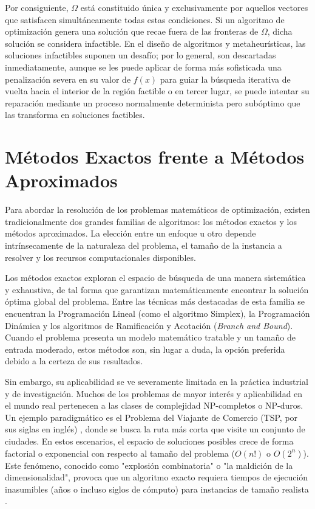 \documentclass[12pt,a4paper,twoside,openright]{book}
\begin{document}
    Por consiguiente, $\Omega$ está constituido única y exclusivamente por aquellos vectores que satisfacen simultáneamente todas estas condiciones. Si un algoritmo de optimización genera una solución que recae fuera de las fronteras de $\Omega$, dicha solución se considera infactible. En el diseño de algoritmos y metaheurísticas, las soluciones infactibles suponen un desafío; por lo general, son descartadas inmediatamente, aunque se les puede aplicar de forma más sofisticada una penalización severa en su valor de $f(x)$ para guiar la búsqueda iterativa de vuelta hacia el interior de la región factible o en tercer lugar, se puede intentar su reparación mediante un proceso normalmente determinista pero subóptimo que las transforma en soluciones factibles.

 \section{Métodos Exactos frente a Métodos Aproximados}

    Para abordar la resolución de los problemas matemáticos de optimización, existen tradicionalmente dos grandes familias de algoritmos: los métodos exactos y los métodos aproximados. La elección entre un enfoque u otro depende intrínsecamente de la naturaleza del problema, el tamaño de la instancia a resolver y los recursos computacionales disponibles.

    Los métodos exactos exploran el espacio de búsqueda de una manera sistemática y exhaustiva, de tal forma que garantizan matemáticamente encontrar la solución óptima global del problema. Entre las técnicas más destacadas de esta familia se encuentran la Programación Lineal (como el algoritmo Simplex), la Programación Dinámica y los algoritmos de Ramificación y Acotación (\textit{Branch and Bound}). Cuando el problema presenta un modelo matemático tratable y un tamaño de entrada moderado, estos métodos son, sin lugar a duda, la opción preferida debido a la certeza de sus resultados.

    Sin embargo, su aplicabilidad se ve severamente limitada en la práctica industrial y de investigación. Muchos de los problemas de mayor interés y aplicabilidad en el mundo real pertenecen a las clases de complejidad NP-completos o NP-duros. Un ejemplo paradigmático es el Problema del Viajante de Comercio (TSP, por sus siglas en inglés) \cite{talbi2009metaheuristics}, donde se busca la ruta más corta que visite un conjunto de ciudades. En estos escenarios, el espacio de soluciones posibles crece de forma factorial o exponencial con respecto al tamaño del problema ($O(n!)$ o $O(2^n)$). Este fenómeno, conocido como "explosión combinatoria" o "la maldición de la dimensionalidad", provoca que un algoritmo exacto requiera tiempos de ejecución inasumibles (años o incluso siglos de cómputo) para instancias de tamaño realista \cite{karp1972reducibility}.
\end{document}
